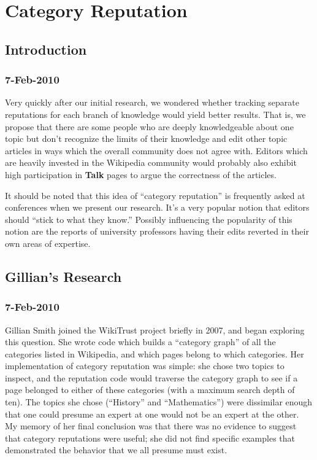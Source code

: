 \chapter{Category Reputation}

\section{Introduction}

\subsection{7-Feb-2010}

Very quickly after our initial research, we wondered whether
tracking separate reputations for each branch of knowledge
would yield better results.
That is, we propose that there are some people who are deeply
knowledgeable about one topic but don't recognize the limits
of their knowledge and edit other topic articles in ways which
the overall community does not agree with.
Editors which are heavily invested in the Wikipedia community
would probably also exhibit high participation in \textbf{Talk}
pages to argue the correctness of the articles.

It should be noted that this idea of ``category reputation''
is frequently asked at conferences when we present our research.
It's a very popular notion that editors should ``stick to what
they know.''
Possibly influencing the popularity of this notion are the reports
of university professors having their edits reverted in their
own areas of expertise.

\section{Gillian's Research}

\subsection{7-Feb-2010}

Gillian Smith joined the WikiTrust project briefly in 2007, and
began exploring this question.
She wrote code which builds a ``category graph'' of all the
categories listed in Wikipedia, and which pages belong to which
categories.
Her implementation of category reputation was simple: she chose
two topics to inspect, and the reputation code would traverse the
category graph to see if a page belonged to either of these
categories (with a maximum search depth of ten).
The topics she chose (``History'' and ``Mathematics'') were
dissimilar enough that one could presume an expert at one would
not be an expert at the other.
My memory of her final conclusion was that there was no evidence
to suggest that category reputations were useful;
she did not find specific examples that demonstrated the
behavior that we all presume must exist.

